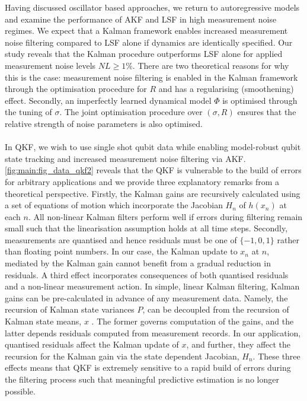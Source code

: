 \documentclass[pra, reprint]{revtex4-1}
\begin{document}
Having discussed oscillator based approaches, we return to autoregressive models and examine the performance of AKF and LSF in high measurement noise regimes. We expect that a Kalman framework enables increased measurement noise filtering compared to LSF alone if dynamics are identically specified.  Our study reveals that the Kalman procedure outperforms LSF alone for applied measurement noise levels $NL \geq 1\%$. There are two theoretical reasons for why this is the case: measurement noise filtering is enabled in the Kalman framework through the optimisation procedure for $R$ and has a regularising (smoothening) effect. Secondly, an imperfectly learned dynamical model $\Phi$ is optimised through the tuning of $\sigma$. The joint optimisation procedure over $(\sigma, R)$ ensures that the relative strength of noise parameters is also optimised.
\\
\\
In QKF, we wish to use single shot qubit data while enabling model-robust qubit state tracking and increased measurement noise filtering via AKF. \cref{fig:main:fig_data_qkf2} reveals that the QKF is vulnerable to the build of errors for arbitrary applications and we provide three explanatory remarks from a theoretical perspective. Firstly, the Kalman gains are recursively calculated using a set of  equations of motion which incorporate the Jacobian $H_n$ of $h(x_n)$ at each $n$. All non-linear Kalman filters perform well if errors during filtering remain small such that the linearisation assumption holds at all time steps. Secondly, measurements are quantised and hence residuals must be one of $\{-1, 0, 1 \}$ rather than floating point numbers.  In our case, the Kalman update to $x_n$ at $n$, mediated by the Kalman gain cannot benefit from a gradual reduction in residuals. A third effect incorporates consequences of both quantised residuals and a non-linear measurement action. In simple, linear Kalman filtering, Kalman gains can be pre-calculated in advance of any measurement data. Namely, the recursion of Kalman state variances $P$, can be decoupled from the recursion of Kalman state means, $x$ \cite{grewal2001theory}. The former governs computation of the gains, and the latter depends residuals computed from measurement records. In our application, quantised residuals affect the Kalman update of $x$, and further, they affect the recursion for the Kalman gain via the state dependent Jacobian, $H_n$. These three effects means that QKF is extremely sensitive to a rapid build of errors during the filtering process such that meaningful predictive estimation is no longer possible.
\end{document}
